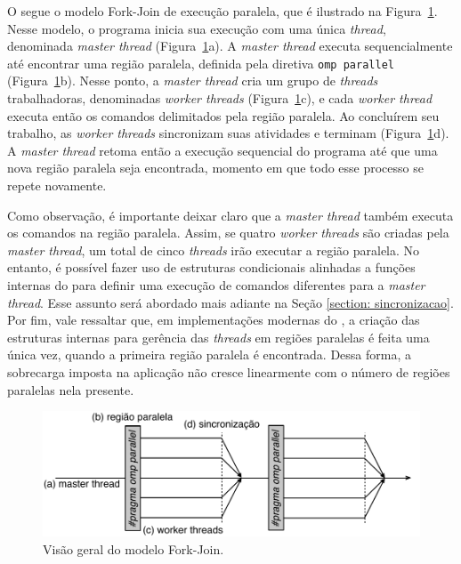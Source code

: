 \documentclass{SBCbookchapter}
\begin{document}
		O \openmp segue o modelo Fork-Join de execução paralela, que é
		ilustrado na Figura~\ref{fig:fork-join}. Nesse modelo, o programa inicia sua
		execução com uma única \textit{thread}, denominada \textit{master thread}
		(Figura~\ref{fig:fork-join}a). A \textit{master thread} executa sequencialmente até
		encontrar uma região paralela, definida pela diretiva \texttt{omp parallel}
		(Figura~\ref{fig:fork-join}b). Nesse ponto, a \textit{master thread} cria um grupo
		de \textit{threads} trabalhadoras, denominadas \textit{worker threads}
		(Figura~\ref{fig:fork-join}c), e cada \textit{worker thread} executa então os
		comandos delimitados pela região paralela. Ao concluírem seu
		trabalho, as \textit{worker threads} sincronizam suas atividades e
		terminam (Figura~\ref{fig:fork-join}d). A \textit{master thread} retoma então a
		execução sequencial do programa até que uma nova região paralela
		seja encontrada, momento em que todo esse processo se repete
		novamente.
		
		Como observação, é importante deixar claro que a \textit{master
		thread} também executa os comandos na região paralela. Assim, se
		quatro \textit{worker threads} são criadas pela \textit{master
		thread}, um total de cinco \textit{threads} irão executar a região paralela.
		No entanto, é possível fazer uso de estruturas condicionais
		alinhadas a funções internas do \openmp para definir uma execução de
		comandos diferentes para a \textit{master thread}. Esse assunto será
		abordado mais adiante na Seção \ref{section: sincronizacao}. Por
		fim, vale ressaltar que, em implementações modernas do \openmp, a
		criação das estruturas internas para gerência das \textit{threads} em regiões
		paralelas é feita uma única vez, quando a primeira região paralela é
		encontrada. Dessa forma, a sobrecarga imposta na aplicação não
		cresce linearmente com o número de regiões paralelas nela presente.

			\begin{figure}[t]
				\centering
				\includegraphics[width=0.8\linewidth]{img/fork-join}
				\caption{Visão geral do modelo Fork-Join.}\label{fig:fork-join}
			\end{figure}
\end{document}
